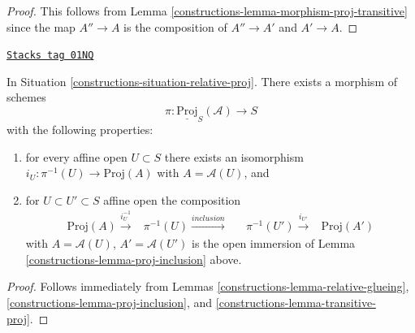 \begin{proof}

This follows from Lemma \ref{constructions-lemma-morphism-proj-transitive} since
the map $A'' \to A$ is the composition of $A'' \to A'$ and
$A' \to A$.
\end{proof}

\begin{lemma}
\label{constructions-lemma-glue-relative-proj}
\href{https://stacks.math.columbia.edu/tag/01NQ}{\texttt{Stacks tag 01NQ}}

In Situation \ref{constructions-situation-relative-proj}.
There exists a morphism of schemes
$$
\pi : \underline{\text{Proj}}_S(\mathcal{A}) \longrightarrow S
$$
with the following properties:
\begin{enumerate}
\item for every affine open $U \subset S$ there exists an isomorphism
$i_U : \pi^{-1}(U) \to \text{Proj}(A)$ with $A = \mathcal{A}(U)$, and
\item for $U \subset U' \subset S$ affine open the composition
$$
\begin{array}{ccccc}\text{Proj}(A) \overset{i_U^{-1}}{\longrightarrow} & \pi^{-1}(U) \overset{inclusion}{\longrightarrow} &  & \pi^{-1}(U') \overset{i_{U'}}{\longrightarrow} & \text{Proj}(A')\end{array}
$$
with $A = \mathcal{A}(U)$, $A' = \mathcal{A}(U')$
is the open immersion of Lemma \ref{constructions-lemma-proj-inclusion} above.
\end{enumerate}
\end{lemma}

\begin{proof}

Follows immediately from
Lemmas \ref{constructions-lemma-relative-glueing},
\ref{constructions-lemma-proj-inclusion}, and
\ref{constructions-lemma-transitive-proj}.
\end{proof}

